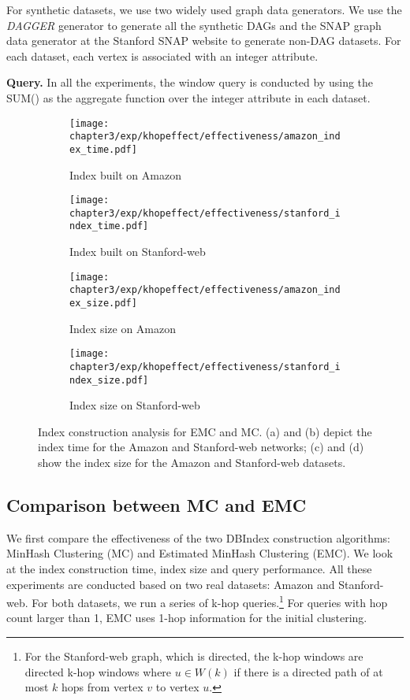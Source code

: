 For synthetic datasets, we use two widely used graph data generators. 
We use the \emph{DAGGER} generator \cite{yildirim2013dagger} to generate 
all the synthetic DAGs and the SNAP graph data generator at the
Stanford SNAP website to generate non-DAG datasets. For each dataset, each vertex is associated with an integer attribute.

\textbf{Query.} In all the experiments, the window query is conducted 
by using the SUM() as the aggregate function over the integer attribute in each dataset. 

\begin{figure*}[t]
\centering
\begin{subfigure}{0.45\textwidth}
  \texttt{[image: chapter3/exp/khopeffect/effectiveness/amazon\_index\_time.pdf]}
  \caption{Index built on Amazon}
\end{subfigure}
\begin{subfigure}{0.45\textwidth}
  \texttt{[image: chapter3/exp/khopeffect/effectiveness/stanford\_index\_time.pdf]}
  \caption{Index built on Stanford-web}
\end{subfigure}

\begin{subfigure}{0.45\textwidth}
  \texttt{[image: chapter3/exp/khopeffect/effectiveness/amazon\_index\_size.pdf]}
  \caption{Index size on Amazon}
\end{subfigure}
\begin{subfigure}{0.45\textwidth}
  \texttt{[image: chapter3/exp/khopeffect/effectiveness/stanford\_index\_size.pdf]}
  \caption{Index size on Stanford-web}
\end{subfigure}
\caption{Index construction analysis for EMC and MC. (a) and (b) 
depict the index time for the Amazon and Stanford-web networks; 
(c) and (d) show the index size for the Amazon and Stanford-web datasets.}
\label{fig:index_analysis_emc_mc}
\end{figure*}


\subsection{Comparison between MC and EMC}\label{sec:mc_vs_emc}
We first compare the effectiveness of the two DBIndex 
construction algorithms: MinHash Clustering (MC) and Estimated 
MinHash Clustering (EMC). We look at 
the index construction time, index size and query performance. 
All these experiments are conducted based on two real datasets: 
Amazon and Stanford-web. For both datasets, we run a series of k-hop queries.\footnote{For the Stanford-web graph, which is directed,
the k-hop windows are directed k-hop windows where $u \in W(k)$ if there is a directed path
of at most $k$ hops from vertex $v$ to vertex $u$.
} For queries with hop count larger than 1, 
EMC uses 1-hop information for the initial clustering. 

